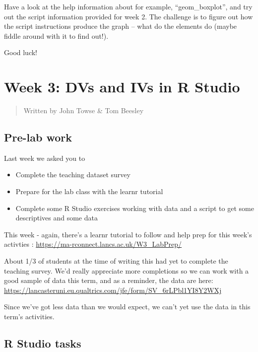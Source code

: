 \documentclass[
]{book}
\providecommand{\tightlist}{%
  \setlength{\itemsep}{0pt}\setlength{\parskip}{0pt}}
\begin{document}
Have a look at the help information about for example, ``geom\_boxplot'', and try out the script information provided for week 2. The challenge is to figure out how the script instructions produce the graph -- what do the elements do (maybe fiddle around with it to find out!).

Good luck!

\hypertarget{week-3-dvs-and-ivs-in-r-studio}{%
\chapter{Week 3: DVs and IVs in R Studio}\label{week-3-dvs-and-ivs-in-r-studio}}

\begin{quote}
Written by John Towse \& Tom Beesley
\end{quote}

\hypertarget{pre-lab-work-1}{%
\section{Pre-lab work}\label{pre-lab-work-1}}

Last week we asked you to

\begin{itemize}
\tightlist
\item
  Complete the teaching dataset survey
\item
  Prepare for the lab class with the learnr tutorial
\item
  Complete some R Studio exercises working with data and a script to get some descriptives and some data
\end{itemize}

This week - again, there's a learnr tutorial to follow and help prep for this week's activties : \url{https://ma-rconnect.lancs.ac.uk/W3_LabPrep/}

About 1/3 of students at the time of writing this had yet to complete the teaching survey. We'd really appreciate more completions so we can work with a good sample of data this term, and as a reminder, the data are here: \url{https://lancasteruni.eu.qualtrics.com/jfe/form/SV_6rLPbl1YI8Y2WXj}

Since we've got less data than we would expect, we can't yet use the data in this term's activities.

\hypertarget{r-studio-tasks-1}{%
\section{R Studio tasks}\label{r-studio-tasks-1}}
\end{document}
